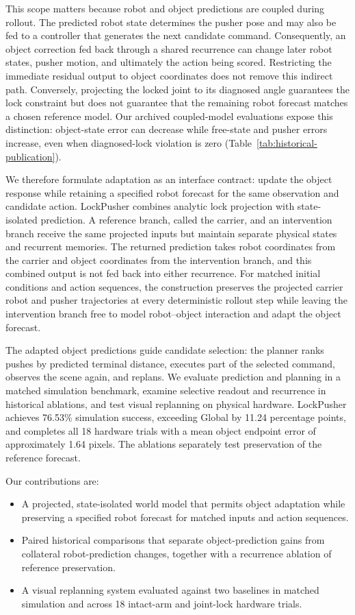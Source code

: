 \documentclass[conference]{IEEEtran}
\begin{document}
This scope matters because robot and object predictions are coupled during rollout. The predicted robot state determines the pusher pose and may also be fed to a controller that generates the next candidate command. Consequently, an object correction fed back through a shared recurrence can change later robot states, pusher motion, and ultimately the action being scored. Restricting the immediate residual output to object coordinates does not remove this indirect path. Conversely, projecting the locked joint to its diagnosed angle guarantees the lock constraint but does not guarantee that the remaining robot forecast matches a chosen reference model. Our archived coupled-model evaluations expose this distinction: object-state error can decrease while free-state and pusher errors increase, even when diagnosed-lock violation is zero (Table~\ref{tab:historical-publication}).

We therefore formulate adaptation as an interface contract: update the object response while retaining a specified robot forecast for the same observation and candidate action. LockPusher combines analytic lock projection with state-isolated prediction. A reference branch, called the carrier, and an intervention branch receive the same projected inputs but maintain separate physical states and recurrent memories. The returned prediction takes robot coordinates from the carrier and object coordinates from the intervention branch, and this combined output is not fed back into either recurrence. For matched initial conditions and action sequences, the construction preserves the projected carrier robot and pusher trajectories at every deterministic rollout step while leaving the intervention branch free to model robot--object interaction and adapt the object forecast.

The adapted object predictions guide candidate selection: the planner ranks pushes by predicted terminal distance, executes part of the selected command, observes the scene again, and replans. We evaluate prediction and planning in a matched simulation benchmark, examine selective readout and recurrence in historical ablations, and test visual replanning on physical hardware. LockPusher achieves 76.53\% simulation success, exceeding Global by 11.24 percentage points, and completes all 18 hardware trials with a mean object endpoint error of approximately 1.64 pixels. The ablations separately test preservation of the reference forecast.

Our contributions are:
\begin{itemize}
\item A projected, state-isolated world model that permits object adaptation while preserving a specified robot forecast for matched inputs and action sequences.
\item Paired historical comparisons that separate object-prediction gains from collateral robot-prediction changes, together with a recurrence ablation of reference preservation.
\item A visual replanning system evaluated against two baselines in matched simulation and across 18 intact-arm and joint-lock hardware trials.
\end{itemize}
\end{document}
